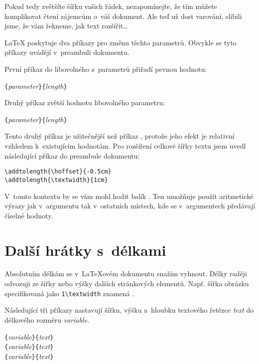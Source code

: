 Pokud tedy zvětšíte šířku vašich řádek, nezapomínejte, že tím můžete
komplikovat čtení zájemcům o~váš dokument. Ale teď už dost varování,
slíbili jsme, že vám řekneme, jak text rozšířit\ldots

\LaTeX{} poskytuje dva příkazy pro změnu těchto parametrů. Obvykle
se tyto příkazy uvádějí v~preambuli dokumentu.

První příkaz do libovolného z~parametrů přiřadí pevnou hodnotu:
\begin{lscommand}
\verb|{|\emph{parameter}\verb|}{|\emph{length}\verb|}|
\end{lscommand}

Druhý příkaz zvětší hodnotu libovolného parametru:
\begin{lscommand}
\verb|{|\emph{parameter}\verb|}{|\emph{length}\verb|}|
\end{lscommand} 

Tento druhý příkaz je užitečnější než příkaz , protože
jeho efekt je relativní vzhledem k~existujícím hodnotám. Pro rozšíření
celkové šířky textu jsem uvedl následující příkaz do preambule dokumentu:
\begin{code}
\verb|\addtolength{\hoffset}{-0.5cm}|\\
\verb|\addtolength{\textwidth}{1cm}|
\end{code}

V~tomto kontextu by se vám mohl hodit balík . Ten
umožňuje použít aritmetické výrazy jak v~argumentu 
tak v~ostatních místech, kde se v~argumentech předávají číselné
hodnoty.

\section{Další hrátky s~délkami}

Absolutním délkám se v~\LaTeX ovém dokumentu snažím vyhnout.
Délky raději odvozuji ze šířky nebo výšky dalších stránkových
elementů. Např. šířka obrázku specifikovaná jako
\verb|1\textwidth| znamená .

Následující tři příkazy nastavují šířku, výšku a~hloubku textového řetězce \emph{text} do délkového rozměru \emph{variable}.

\begin{lscommand}
\verb|{|\emph{variable}\verb|}{|\emph{text}\verb|}|\\
\verb|{|\emph{variable}\verb|}{|\emph{text}\verb|}|\\
\verb|{|\emph{variable}\verb|}{|\emph{text}\verb|}|
\end{lscommand}

